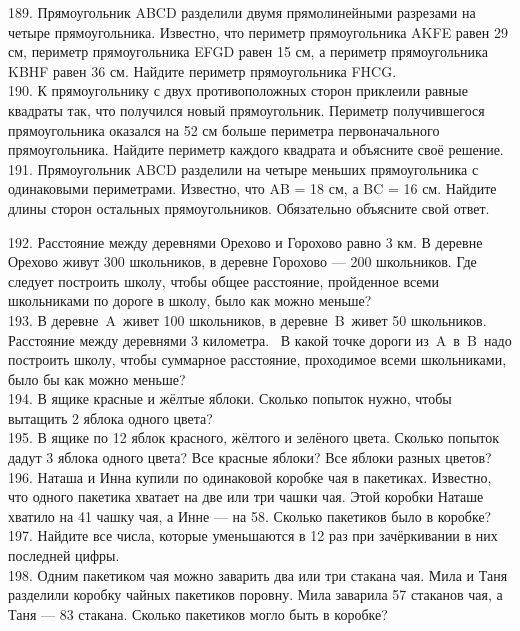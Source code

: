 189. Прямоугольник ABCD разделили двумя прямолинейными разрезами на четыре прямоугольника. Известно, что периметр прямоугольника AKFE равен 29 см, периметр прямоугольника EFGD равен 15 см,  а периметр прямоугольника KBHF равен 36 см. Найдите периметр прямоугольника FHCG.\\
190.  К прямоугольнику с двух противоположных сторон приклеили равные квадраты так, что получился новый прямоугольник. Периметр получившегося прямоугольника оказался на 52 см больше периметра первоначального прямоугольника. Найдите периметр каждого квадрата и объясните своё решение.\\
191. Прямоугольник ABCD разделили на четыре меньших прямоугольника с одинаковыми периметрами. Известно, что AB = 18 см, а BC = 16 см. Найдите длины сторон остальных прямоугольников. Обязательно объясните свой ответ.
\begin{center}
\begin{figure}[ht!]
\end{figure}
\end{center}
192. Расстояние между деревнями Орехово и Горохово равно 3 км. В деревне Орехово живут 300 школьников, в деревне Горохово --- 200 школьников. Где следует построить школу, чтобы общее расстояние, пройденное всеми школьниками по дороге в школу, было как можно меньше?\\
193. В деревне A живет 100 школьников, в деревне B живет 50 школьников. Расстояние между деревнями 3 километра. 
В какой точке дороги из A в B надо построить школу, чтобы суммарное расстояние, проходимое всеми школьниками, было бы как можно меньше?\\
194. В ящике красные и жёлтые яблоки. Сколько попыток нужно, чтобы вытащить 2 яблока одного цвета?\\
195. В ящике по 12 яблок красного, жёлтого и зелёного цвета. Сколько попыток дадут 3 яблока одного цвета? Все красные яблоки? Все яблоки разных цветов?\\
196. Наташа и Инна купили по одинаковой коробке чая в пакетиках. Известно, что одного пакетика хватает на две или три чашки чая. Этой коробки Наташе хватило на 41 чашку чая, а Инне --- на 58. Сколько пакетиков было в коробке?\\
197. Найдите все числа, которые уменьшаются в 12 раз при зачёркивании в них последней цифры.\\
198. Одним пакетиком чая можно заварить два или три стакана чая. Мила и Таня разделили коробку чайных пакетиков поровну. Мила заварила 57 стаканов чая, а Таня --- 83 стакана. Сколько пакетиков могло быть в коробке?\\
